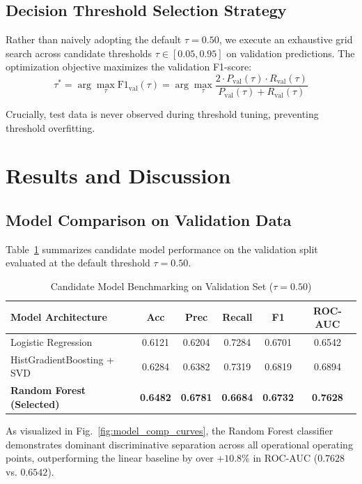 \documentclass[journal,10pt,twocolumn]{IEEEtran}
\begin{document}
\subsection{Decision Threshold Selection Strategy}
Rather than naively adopting the default $\tau = 0.50$, we execute an exhaustive grid search across candidate thresholds $\tau \in [0.05, 0.95]$ on validation predictions. The optimization objective maximizes the validation F1-score:
\begin{equation}
\tau^* = \arg\max_{\tau} \text{F1}_{\text{val}}(\tau) = \arg\max_{\tau} \frac{2 \cdot P_{\text{val}}(\tau) \cdot R_{\text{val}}(\tau)}{P_{\text{val}}(\tau) + R_{\text{val}}(\tau)}
\label{eq:threshold_opt}
\end{equation}

Crucially, test data is never observed during threshold tuning, preventing threshold overfitting.

\section{Results and Discussion}
\label{sec:results}

\subsection{Model Comparison on Validation Data}
Table~\ref{tab:model_comparison} summarizes candidate model performance on the validation split evaluated at the default threshold $\tau = 0.50$.

\begin{table}[htbp]
\caption{Candidate Model Benchmarking on Validation Set ($\tau = 0.50$)}
\label{tab:model_comparison}
\centering
\begin{tabularx}{\columnwidth}{lccccc}
\toprule
\textbf{Model Architecture} & \textbf{Acc} & \textbf{Prec} & \textbf{Recall} & \textbf{F1} & \textbf{ROC-AUC} \\
\midrule
Logistic Regression & 0.6121 & 0.6204 & 0.7284 & 0.6701 & 0.6542 \\
HistGradientBoosting + SVD & 0.6284 & 0.6382 & 0.7319 & 0.6819 & 0.6894 \\
\textbf{Random Forest (Selected)} & \textbf{0.6482} & \textbf{0.6781} & \textbf{0.6684} & \textbf{0.6732} & \textbf{0.7628} \\
\bottomrule
\end{tabularx}
\end{table}

As visualized in Fig.~\ref{fig:model_comp_curves}, the Random Forest classifier demonstrates dominant discriminative separation across all operational operating points, outperforming the linear baseline by over $+10.8\%$ in ROC-AUC ($0.7628$ vs. $0.6542$).
\end{document}
